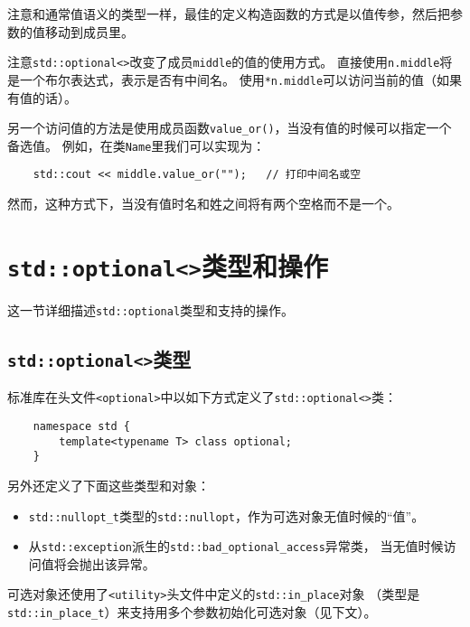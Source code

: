 注意和通常值语义的类型一样，最佳的定义构造函数的方式是以值传参，然后把参数的值移动到成员里。

注意\texttt{std::optional<>}改变了成员\texttt{middle}的值的使用方式。
直接使用\texttt{n.middle}将是一个布尔表达式，表示是否有中间名。
使用\texttt{*n.middle}可以访问当前的值（如果有值的话）。

另一个访问值的方法是使用成员函数\texttt{value\_or()}，当没有值的时候可以指定一个备选值。
例如，在类\texttt{Name}里我们可以实现为：
\begin{lstlisting}
    std::cout << middle.value_or("");   // 打印中间名或空
\end{lstlisting}
然而，这种方式下，当没有值时名和姓之间将有两个空格而不是一个。


\section{\texttt{std::optional<>}类型和操作}
这一节详细描述\texttt{std::optional}类型和支持的操作。

\subsection{\texttt{std::optional<>}类型}
标准库在头文件\texttt{<optional>}中以如下方式定义了\texttt{std::optional<>}类：
\begin{lstlisting}
    namespace std {
        template<typename T> class optional;
    }
\end{lstlisting}
另外还定义了下面这些类型和对象：\label{nullopt}
\begin{itemize}
    \item \texttt{std::nullopt\_t}类型的\texttt{std::nullopt}，作为可选对象无值时候的“值”。
    \item 从\texttt{std::exception}派生的\texttt{std::bad\_optional\_access}异常类，
    当无值时候访问值将会抛出该异常。
\end{itemize}
可选对象还使用了\texttt{<utility>}头文件中定义的\texttt{std::in\_place}对象
（类型是\texttt{std::in\_place\_t}）来支持用多个参数初始化可选对象（见下文）。

